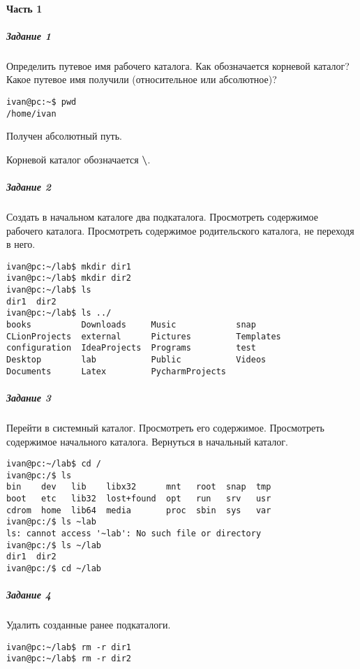 \paragraph{Часть 1}
\subparagraph{Задание 1}

Определить путевое имя рабочего каталога. Как обозначается корневой
каталог? Какое путевое имя получили (относительное или абсолютное)?

\begin{verbatim}
ivan@pc:~$ pwd
/home/ivan
\end{verbatim}

Получен абсолютный путь.

Корневой каталог обозначается \textbf{\textbackslash}.

\subparagraph{Задание 2}

Создать в начальном каталоге два подкаталога. Просмотреть содержимое
рабочего каталога. Просмотреть содержимое родительского каталога, не
переходя в него.

\begin{verbatim}
ivan@pc:~/lab$ mkdir dir1
ivan@pc:~/lab$ mkdir dir2
ivan@pc:~/lab$ ls
dir1  dir2
ivan@pc:~/lab$ ls ../
books          Downloads     Music            snap
CLionProjects  external      Pictures         Templates
configuration  IdeaProjects  Programs         test
Desktop        lab           Public           Videos
Documents      Latex         PycharmProjects
\end{verbatim}

\subparagraph{Задание 3}

Перейти в системный каталог. Просмотреть его содержимое. Просмотреть
содержимое начального каталога. Вернуться в начальный каталог.

\begin{verbatim}
ivan@pc:~/lab$ cd /
ivan@pc:/$ ls
bin    dev   lib    libx32      mnt   root  snap  tmp
boot   etc   lib32  lost+found  opt   run   srv   usr
cdrom  home  lib64  media       proc  sbin  sys   var
ivan@pc:/$ ls ~lab
ls: cannot access '~lab': No such file or directory
ivan@pc:/$ ls ~/lab
dir1  dir2
ivan@pc:/$ cd ~/lab
\end{verbatim}

\subparagraph{Задание 4}

Удалить созданные ранее подкаталоги.

\begin{verbatim}
ivan@pc:~/lab$ rm -r dir1
ivan@pc:~/lab$ rm -r dir2    
\end{verbatim}


